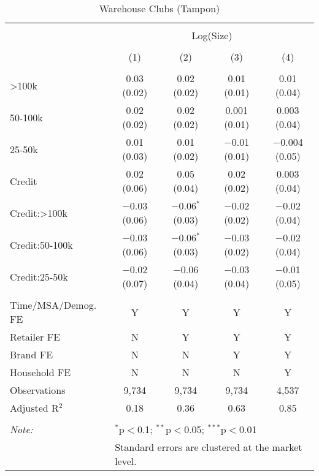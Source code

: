 
\begin{table}[!htbp] \centering 
  \caption{Warehouse Clubs (Tampon)} 
  \label{tab:packageSizeWarehouseTamponLiq} 
\begin{tabular}{@{\extracolsep{5pt}}lcccc} 
\\[-1.8ex]\hline 
\hline \\[-1.8ex] 
 & \multicolumn{4}{c}{Log(Size)} \\ 
\\[-1.8ex] & (1) & (2) & (3) & (4)\\ 
\hline \\[-1.8ex] 
 >100k & 0.03 (0.02) & 0.02 (0.02) & 0.01 (0.01) & 0.01 (0.04) \\ 
  50-100k & 0.02 (0.02) & 0.02 (0.02) & 0.001 (0.01) & 0.003 (0.04) \\ 
  25-50k & 0.01 (0.03) & 0.01 (0.02) & $-$0.01 (0.01) & $-$0.004 (0.05) \\ 
  Credit & 0.02 (0.06) & 0.05 (0.04) & 0.02 (0.02) & 0.003 (0.04) \\ 
  Credit:>100k & $-$0.03 (0.06) & $-$0.06$^{*}$ (0.03) & $-$0.02 (0.02) & $-$0.02 (0.04) \\ 
  Credit:50-100k & $-$0.03 (0.06) & $-$0.06$^{*}$ (0.03) & $-$0.03 (0.02) & $-$0.02 (0.04) \\ 
  Credit:25-50k & $-$0.02 (0.07) & $-$0.06 (0.04) & $-$0.03 (0.04) & $-$0.01 (0.05) \\ 
 \hline \\[-1.8ex] 
Time/MSA/Demog. FE & Y & Y & Y & Y \\ 
Retailer FE & N & Y & Y & Y \\ 
Brand FE & N & N & Y & Y \\ 
Household FE & N & N & N & Y \\ 
Observations & 9,734 & 9,734 & 9,734 & 4,537 \\ 
Adjusted R$^{2}$ & 0.18 & 0.36 & 0.63 & 0.85 \\ 
\hline 
\hline \\[-1.8ex] 
\textit{Note:}  & \multicolumn{4}{l}{$^{*}$p$<$0.1; $^{**}$p$<$0.05; $^{***}$p$<$0.01} \\ 
 & \multicolumn{4}{l}{Standard errors are clustered at the market level.} \\ 
\end{tabular} 
\end{table} 

